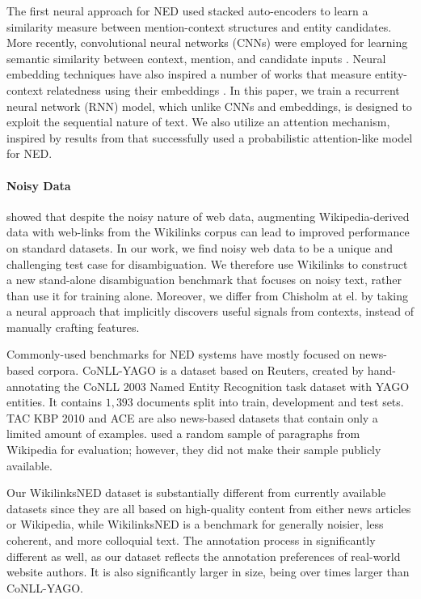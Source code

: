 \documentclass[11pt,letterpaper]{article}
\begin{document}
	The first neural approach for NED \cite{he2013learning} used stacked auto-encoders to learn a similarity measure between mention-context structures and entity candidates. More recently, convolutional neural networks (CNNs) were employed for learning semantic similarity between context, mention, and candidate inputs \cite{sun2015modeling,francis2016capturing}. Neural embedding techniques have also inspired a number of works that measure entity-context relatedness using their embeddings \cite{yamada2016joint,Hu2015Entity}. In this paper, we train a recurrent neural network (RNN) model, which unlike CNNs and embeddings, is designed to exploit the sequential nature of text. We also utilize an attention mechanism, inspired by results from  that successfully used a probabilistic attention-like model for NED.
	
	\paragraph{Noisy Data}
	
	 showed that despite the noisy nature of web data, augmenting Wikipedia-derived data with web-links from the Wikilinks corpus \cite{singh12:wiki-links} can lead to improved performance on standard datasets. 
	In our work, we find noisy web data to be a unique and challenging test case for disambiguation. We therefore use Wikilinks to construct a new stand-alone disambiguation benchmark that focuses on noisy text, rather than use it for training alone. 
	Moreover, we differ from Chisholm at el. by taking a neural approach that implicitly discovers useful signals from contexts, instead of manually crafting features.
	
	Commonly-used benchmarks for NED systems have mostly focused on news-based corpora. CoNLL-YAGO \cite{hoffart2011robust} is a dataset based on Reuters, created by hand-annotating the CoNLL 2003 Named Entity Recognition task dataset with YAGO \cite{suchanek2007} entities. It contains $1,393$ documents split into train, development and test sets. TAC KBP 2010 \cite{ji2010overview} and ACE  are also news-based datasets that contain only a limited amount of examples.  used a random sample of paragraphs from Wikipedia for evaluation; however, they did not make their sample publicly available.
	
	Our WikilinksNED dataset is substantially different from currently available datasets since they are all based on high-quality content from either news articles or Wikipedia, while WikilinksNED is a benchmark for generally noisier, less coherent, and more colloquial text. The annotation process in significantly different as well, as our dataset reflects the annotation preferences of real-world website authors. It is also significantly larger in size, being over  times larger than CoNLL-YAGO.
	
\end{document}
